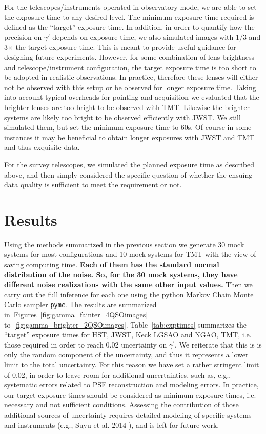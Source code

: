 \documentclass[a4paper,11pt]{article}
\begin{document}
For the telescopes/instruments operated in observatory mode, we are
able to set the exposure time to any desired level. The minimum
exposure time required is defined as the ``target'' exposure time. In
addition, in order to quantify how the precision on $\gamma'$ depends
on exposure time, we also simulated images with 1/3 and 3$\times$ the
target exposure time. This is meant to provide useful guidance for
designing future experiments. However, for some combination of lens
brightness and telescope/instrument configuration, the target exposure
time is too short to be adopted in realistic observations. In
practice, therefore these lenses will either not be observed with this
setup or be observed for longer exposure time. Taking into account
typical overheads for pointing and acquisition we evaluated that the
brighter lenses are too bright to be observed with TMT.  Likewise the
brighter systems are likely too bright to be observed efficiently with
JWST. We still simulated them, but set the minimum exposure time to
60s. Of course in some instances it may be beneficial to obtain longer
exposures with JWST and TMT and thus exquisite data.

For the survey telescopes, we simulated the planned exposure time as
described above, and then  simply considered the specific question of
whether the ensuing data quality is sufficient to meet the requirement
or not.

\section{Results}

Using the methods summarized in the previous section we generate 30
mock systems for most configurations and 10 mock systems for TMT with
the view of saving computing time. {\bf Each of them has 
the standard normal distribution of the noise. So, for the 30 mock systems, 
they have different noise realizations with the same other input values.} 
Then we carry out the full inference
for each one using the python Markov Chain Monte Carlo sampler
\texttt{pymc}.  The results are summarized
in~Figures~\ref{fig:gamma_fainter_4QSOimages}
to~\ref{fig:gamma_brighter_2QSOimages}. Table~\ref{tab:exptimes}
summarizes the ``target'' exposure times for HST, JWST, Keck LGSAO and
NGAO, TMT, i.e. those required in order to reach 0.02 uncertainty on
$\gamma^{\prime}$.  We reiterate that this is is only the random
component of the uncertainty, and thus it represents a lower limit to
the total uncertainty. For this reason we have set a rather stringent
limit of 0.02, in order to leave room for additional uncertainties,
such as, e.g., systematic errors related to PSF reconstruction and
modeling errors.  In practice, our target exposure times should be
considered as minimum exposure times, i.e. necessary and not
sufficient conditions. Assessing the contribution of those additional
sources of uncertainty requires detailed modeling of specific systems
and instruments (e.g., Suyu et al. 2014 \cite{2014ApJ...788L..35S}),
and is left for future work.
\end{document}
